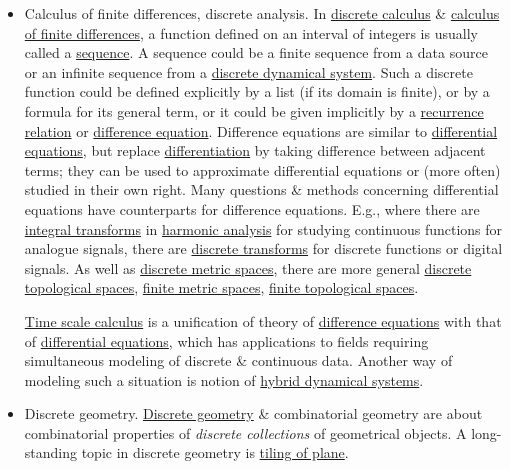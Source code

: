 \documentclass{article}
\begin{document}
\begin{enumerate}
\begin{itemize}
		\item {\sf Calculus of finite differences, discrete analysis.} In \href{https://en.wikipedia.org/wiki/Discrete_calculus}{discrete calculus} \& \href{https://en.wikipedia.org/wiki/Calculus_of_finite_differences}{calculus of finite differences}, a function defined on an interval of integers is usually called a \href{https://en.wikipedia.org/wiki/Sequence}{sequence}. A sequence could be a finite sequence from a data source or an infinite sequence from a \href{https://en.wikipedia.org/wiki/Discrete_dynamical_system}{discrete dynamical system}. Such a discrete function could be defined explicitly by a list (if its domain is finite), or by a formula for its general term, or it could be given implicitly by a \href{https://en.wikipedia.org/wiki/Recurrence_relation}{recurrence relation} or \href{https://en.wikipedia.org/wiki/Difference_equation}{difference equation}. Difference equations are similar to \href{https://en.wikipedia.org/wiki/Differential_equation}{differential equations}, but replace \href{https://en.wikipedia.org/wiki/Derivative}{differentiation} by taking difference between adjacent terms; they can be used to approximate differential equations or (more often) studied in their own right. Many questions \& methods concerning differential equations have counterparts for difference equations. E.g., where there are \href{https://en.wikipedia.org/wiki/Integral_transforms}{integral transforms} in \href{https://en.wikipedia.org/wiki/Harmonic_analysis}{harmonic analysis} for studying continuous functions for analogue signals, there are \href{https://en.wikipedia.org/wiki/Discrete_transform}{discrete transforms} for discrete functions or digital signals. As well as \href{https://en.wikipedia.org/wiki/Discrete_metric_space}{discrete metric spaces}, there are more general \href{https://en.wikipedia.org/wiki/Discrete_topological_space}{discrete topological spaces}, \href{https://en.wikipedia.org/wiki/Finite_metric_space}{finite metric spaces}, \href{https://en.wikipedia.org/wiki/Finite_topological_space}{finite topological spaces}.
		
		\href{https://en.wikipedia.org/wiki/Time_scale_calculus}{Time scale calculus} is a unification of theory of \href{https://en.wikipedia.org/wiki/Difference_equations}{difference equations} with that of \href{https://en.wikipedia.org/wiki/Differential_equations}{differential equations}, which has applications to fields requiring simultaneous modeling of discrete \& continuous data. Another way of modeling such a situation is notion of \href{https://en.wikipedia.org/wiki/Hybrid_system}{hybrid dynamical systems}.
		\item {\sf Discrete geometry.} \href{https://en.wikipedia.org/wiki/Discrete_geometry}{Discrete geometry} \& combinatorial geometry are about combinatorial properties of {\it discrete collections} of geometrical objects. A long-standing topic in discrete geometry is \href{https://en.wikipedia.org/wiki/Tessellation}{tiling of plane}.
		

\end{itemize}
\end{enumerate}
\end{document}
